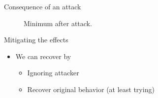 \documentclass[aspectratio=169]{beamer}
\begin{document}
\begin{frame}{Consequence of an attack}
\begin{overlayarea}{\textwidth}{.5\textwidth}
{\begin{minipage}[t]{.45\linewidth}
\begin{figure}[h]
          \caption*{Minimum after attack.}\label{fig:minimum_after_attack}
        \end{figure}
      \end{minipage}
    }
  \end{overlayarea}
\end{frame}

\begin{frame}{Mitigating the effects}
  \vspace{-1.cm}
  \begin{overlayarea}{\textwidth}{.4\textwidth}
    \begin{itemize}[<+(1)->]
      \item We can recover by
            \begin{itemize}[<+(1)->]
              \item Ignoring attacker
              \item Recover original behavior (at least trying)
            \end{itemize}
    \end{itemize}
\end{overlayarea}
\end{frame}
\end{document}
